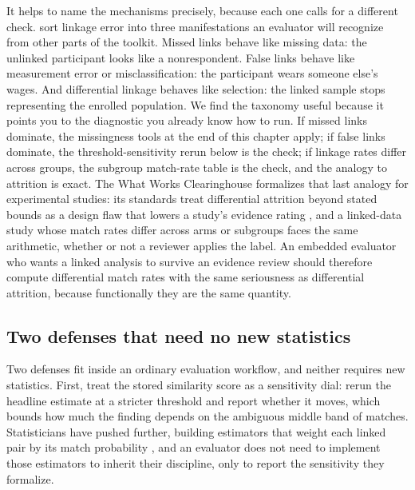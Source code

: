 \documentclass[
    a4paper,
    fontsize=10pt,
    twoside=true,
    numbers=noenddot,
]{kaobook}
\begin{document}
It helps to name the mechanisms precisely, because each one calls for a different check. \textcite{doidge2019linkage} sort linkage error into three manifestations an evaluator will recognize from other parts of the toolkit. Missed links behave like missing data: the unlinked participant looks like a nonrespondent. False links behave like measurement error or misclassification: the participant wears someone else's wages. And differential linkage behaves like selection: the linked sample stops representing the enrolled population. We find the taxonomy useful because it points you to the diagnostic you already know how to run. If missed links dominate, the missingness tools at the end of this chapter apply; if false links dominate, the threshold-sensitivity rerun below is the check; if linkage rates differ across groups, the subgroup match-rate table is the check, and the analogy to attrition is exact. The What Works Clearinghouse formalizes that last analogy for experimental studies: its standards treat differential attrition beyond stated bounds as a design flaw that lowers a study's evidence rating \parencite{wwc2022handbook}, and a linked-data study whose match rates differ across arms or subgroups faces the same arithmetic, whether or not a reviewer applies the label. An embedded evaluator who wants a linked analysis to survive an evidence review should therefore compute differential match rates with the same seriousness as differential attrition, because functionally they are the same quantity.

\subsection{Two defenses that need no new statistics}\label{sec:ch06-defenses}
Two defenses fit inside an ordinary evaluation workflow, and neither requires new statistics. First, treat the stored similarity score as a sensitivity dial: rerun the headline estimate at a stricter threshold and report whether it moves, which bounds how much the finding depends on the ambiguous middle band of matches. Statisticians have pushed further, building estimators that weight each linked pair by its match probability \parencite{lahiri2005linked}, and an evaluator does not need to implement those estimators to inherit their discipline, only to report the sensitivity they formalize.
\end{document}
